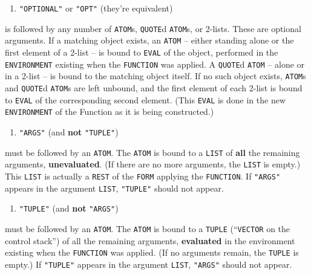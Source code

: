 \documentclass[a4paper]{scrbook}
\providecommand{\tightlist}{%
  \setlength{\itemsep}{0pt}\setlength{\parskip}{0pt}}
\begin{document}
\begin{enumerate}
\def\labelenumi{(\arabic{enumi})}
\setcounter{enumi}{2}
\tightlist
\item
  \texttt{"OPTIONAL"} or \texttt{"OPT"}   (they're equivalent)
\end{enumerate}

is followed by any number of \texttt{ATOM}s, \texttt{QUOTE}d \texttt{ATOM}s, or 2-lists. These are optional arguments. If a
matching object exists, an \texttt{ATOM} -- either standing alone or the first element of a 2-list -- is bound to
\texttt{EVAL} of the object, performed in the \texttt{ENVIRONMENT} existing when the \texttt{FUNCTION} was applied. A
\texttt{QUOTE}d \texttt{ATOM} -- alone or in a 2-list -- is bound to the matching object itself. If no such object exists,
\texttt{ATOM}s and \texttt{QUOTE}d \texttt{ATOM}s are left unbound, and the first element of each 2-list is bound to
\texttt{EVAL} of the corresponding second element. (This \texttt{EVAL} is done in the new \texttt{ENVIRONMENT} of the
Function as it is being constructed.)

\begin{enumerate}
\def\labelenumi{(\arabic{enumi})}
\setcounter{enumi}{3}
\tightlist
\item
  \texttt{"ARGS"} (and \textbf{not} \texttt{"TUPLE"})
\end{enumerate}

must be followed by an \texttt{ATOM}. The \texttt{ATOM} is bound to a \texttt{LIST} of \textbf{all} the remaining
arguments, \textbf{unevaluated}. (If there are no more arguments, the \texttt{LIST} is empty.) This \texttt{LIST} is
actually a \texttt{REST} of the \texttt{FORM} applying the \texttt{FUNCTION}. If \texttt{"ARGS"} 
appears in the argument \texttt{LIST}, \texttt{"TUPLE"} should not appear.

\begin{enumerate}
\def\labelenumi{(\arabic{enumi})}
\setcounter{enumi}{3}
\tightlist
\item
  \texttt{"TUPLE"}  (and \textbf{not} \texttt{"ARGS"})
\end{enumerate}

must be followed by an \texttt{ATOM}. The \texttt{ATOM} is bound to a \texttt{TUPLE} (``\texttt{VECTOR} on the control
stack'') of all the remaining arguments, \textbf{evaluated} in the environment existing when the \texttt{FUNCTION} was
applied. (If no arguments remain, the \texttt{TUPLE} is empty.) If \texttt{"TUPLE"} appears in the argument \texttt{LIST},
\texttt{"ARGS"} should not appear.
\end{document}
